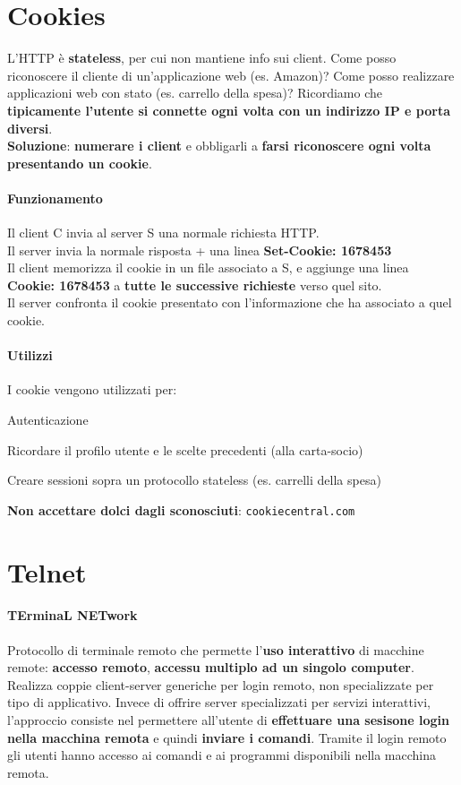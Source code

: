 \documentclass[10pt]{article}
\begin{document}
\section{Cookies}
L'HTTP è \textbf{stateless}, per cui non mantiene info sui client. Come posso riconoscere il cliente di un'applicazione web (es. Amazon)? Come posso realizzare applicazioni web con stato (es. carrello della spesa)? Ricordiamo che \textbf{tipicamente l'utente si connette ogni volta con un indirizzo IP e porta diversi}.\\
\textbf{Soluzione}: \textbf{numerare i client} e obbligarli a \textbf{farsi riconoscere ogni volta presentando un cookie}.
\paragraph{Funzionamento} Il client C invia al server S una normale richiesta HTTP.\\
Il server invia la normale risposta + una linea \textbf{Set-Cookie: 1678453}\\
Il client memorizza il cookie in un file associato a S, e aggiunge una linea \textbf{Cookie: 1678453} a \textbf{tutte le successive richieste} verso quel sito.\\
Il server confronta il cookie presentato con l'informazione che ha associato a quel cookie.
\paragraph{Utilizzi} I cookie vengono utilizzati per:
\begin{list}{-}{}
\item Autenticazione
\item Ricordare il profilo utente e le scelte precedenti (alla carta-socio)
\item Creare sessioni sopra un protocollo stateless (es. carrelli della spesa)
\end{list}
\textbf{Non accettare dolci dagli sconosciuti}: \texttt{cookiecentral.com}
\pagebreak
\section{Telnet}
\paragraph{TErminaL NETwork} Protocollo di terminale remoto che permette l'\textbf{uso interattivo} di macchine remote: \textbf{accesso remoto}, \textbf{accessu multiplo ad un singolo computer}.\\
Realizza coppie client-server generiche per login remoto, non specializzate per tipo di applicativo. Invece di offrire server specializzati per servizi interattivi, l'approccio consiste nel permettere all'utente di \textbf{effettuare una sesisone login nella macchina remota} e quindi \textbf{inviare i comandi}. Tramite il login remoto gli utenti hanno accesso ai comandi e ai programmi disponibili nella macchina remota.
\end{document}
